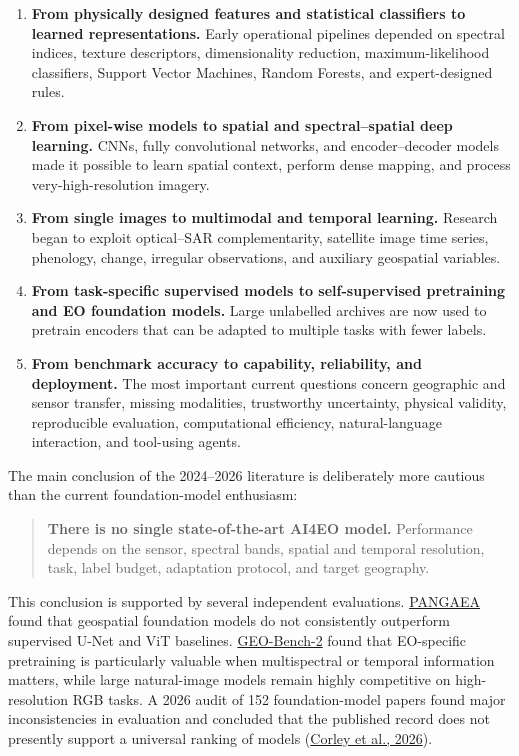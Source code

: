 \documentclass[
  a4paper,
  11pt]{article}
\providecommand{\tightlist}{%
  \setlength{\itemsep}{0pt}\setlength{\parskip}{0pt}}
\begin{document}
\begin{enumerate}
\def\labelenumi{\arabic{enumi}.}
\tightlist
\item
  \textbf{From physically designed features and statistical classifiers
  to learned representations.} Early operational pipelines depended on
  spectral indices, texture descriptors, dimensionality reduction,
  maximum-likelihood classifiers, Support Vector Machines, Random
  Forests, and expert-designed rules.
\item
  \textbf{From pixel-wise models to spatial and spectral--spatial deep
  learning.} CNNs, fully convolutional networks, and encoder--decoder
  models made it possible to learn spatial context, perform dense
  mapping, and process very-high-resolution imagery.
\item
  \textbf{From single images to multimodal and temporal learning.}
  Research began to exploit optical--SAR complementarity, satellite
  image time series, phenology, change, irregular observations, and
  auxiliary geospatial variables.
\item
  \textbf{From task-specific supervised models to self-supervised
  pretraining and EO foundation models.} Large unlabelled archives are
  now used to pretrain encoders that can be adapted to multiple tasks
  with fewer labels.
\item
  \textbf{From benchmark accuracy to capability, reliability, and
  deployment.} The most important current questions concern geographic
  and sensor transfer, missing modalities, trustworthy uncertainty,
  physical validity, reproducible evaluation, computational efficiency,
  natural-language interaction, and tool-using agents.
\end{enumerate}

The main conclusion of the 2024--2026 literature is deliberately more
cautious than the current foundation-model enthusiasm:

\begin{quote}
\textbf{There is no single state-of-the-art AI4EO model.} Performance
depends on the sensor, spectral bands, spatial and temporal resolution,
task, label budget, adaptation protocol, and target geography.
\end{quote}

This conclusion is supported by several independent evaluations.
\href{https://arxiv.org/abs/2412.04204}{PANGAEA} found that geospatial
foundation models do not consistently outperform supervised U-Net and
ViT baselines. \href{https://arxiv.org/html/2511.15658v1}{GEO-Bench-2}
found that EO-specific pretraining is particularly valuable when
multispectral or temporal information matters, while large natural-image
models remain highly competitive on high-resolution RGB tasks. A 2026
audit of 152 foundation-model papers found major inconsistencies in
evaluation and concluded that the published record does not presently
support a universal ranking of models
(\href{https://arxiv.org/html/2605.12678v1}{Corley et al., 2026}).
\end{document}
